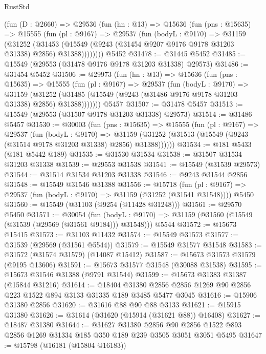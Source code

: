 \begin{lexlean}{RustStd}
\begin{coremodule}
    (fun (D : @2660) =>
    @29536
      (fun (hn : @13) =>
      @15636
        (fun (pns : @15635) =>
        @15555
          (fun (pl : @9167) =>
          @29537
            (fun (bodyL : @9170) =>
            @31159
              (@31252
                (@31453
                  (@15549 (@9243 (@31454 @9207 @9176 @9178 @31203 @31338) @2856) @31388))))))))
    @5452
@31478 := @31445 @5452
@31485 := @15549 (@29553 (@31478 @9176 @9178 @31203 @31338) @29573)
@31486 := @31454 @5452
@31506 := @29973
    (fun (hn : @13) =>
    @15636
      (fun (pns : @15635) =>
      @15555
        (fun (pl : @9167) =>
        @29537
          (fun (bodyL : @9170) =>
          @31159
            (@31252 (@31485 (@15549 (@9243 (@31486 @9176 @9178 @31203 @31338) @2856) @31388)))))))
    @5457
@31507 := @31478 @5457
@31513 := @15549 (@29553 (@31507 @9178 @31203 @31338) @29573)
@31514 := @31486 @5457
@31530 := @30003
    (fun (pns : @15635) =>
    @15555
      (fun (pl : @9167) =>
      @29537
        (fun (bodyL : @9170) =>
        @31159 (@31252 (@31513 (@15549 (@9243 (@31514 @9178 @31203 @31338) @2856) @31388))))))
@31534 := @181 @5433 (@181 @5442 @189)
@31535 := @31530 @31534
@31538 := @31507 @31534 @31203 @31338
@31539 := @29553 @31538
@31541 := @15549 (@31539 @29573)
@31544 := @31514 @31534 @31203 @31338
@31546 := @9243 @31544 @2856
@31548 := @15549 @31546 @31388
@31556 := @15718
    (fun (pl : @9167) => @29537 (fun (bodyL : @9170) => @31159 (@31252 (@31541 @31548))))
    @5450
@31560 := @15549 (@31103 (@9254 (@11428 @31248)))
@31561 := @29570 @5450
@31571 := @30054
    (fun (bodyL : @9170) => @31159 (@31560 (@15549 (@31539 (@29569 (@31561 @9184))) @31548)))
    @5544
@31572 := @15673 @15415
@31573 := @31103 @11432
@31574 := @15549 @31573
@31577 := @31539 (@29569 (@31561 @5544))
@31579 := @15549 @31577 @31548
@31583 := @31572 (@31574 @31579) (@14087 @15412)
@31587 := @15673 @31573 @31579 (@9195 @13606)
@31591 := @15673 @31577 @31548 (@30088 @31538)
@31595 := @15673 @31546 @31388 (@9791 @31544)
@31599 := @15673 @31383 @31387 (@15844 @31216)
@31614 := @18404
    @31380
    @2856
    @2856
    @1269
    @90
    @2856
    @223
    @1522
    @894
    @3133
    @31335
    @189
    @3485
    @5477
    @3045
@31616 := @15906 @31380 @2856
@31620 := @31616 @88 @90 @88 @3133
@31621 := @15915 @31380
@31626 := @31614 (@31620 (@15914 (@31621 @88)) @16408)
@31627 := @18487 @31380
@31644 := @31627
    @31380
    @2856
    @90
    @2856
    @1522
    @893
    @2856
    @1269
    @31334
    @185
    @350
    @189
    @239
    @3505
    @3051
    @3051
    @5495
@31647 := @15798 (@16181 (@15804 @16183))

\end{coremodule}
\end{lexlean}
